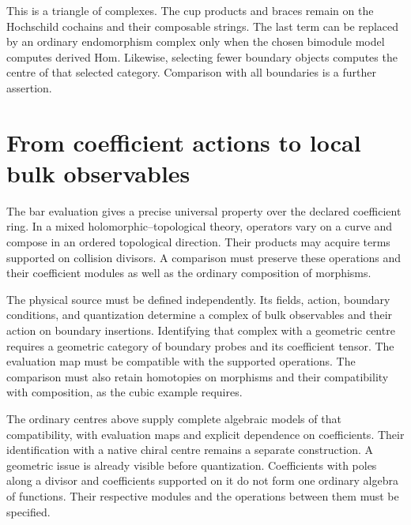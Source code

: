 This is a triangle of complexes. The cup products and braces
remain on the Hochschild cochains and their composable strings.
The last term can be replaced by an ordinary endomorphism
complex only when the chosen bimodule model computes derived Hom.
Likewise, selecting fewer boundary objects computes the centre
of that selected category. Comparison with all boundaries is
a further assertion.

\section{From coefficient actions to local bulk observables}
\label{sec:vol2-centre-geometric-comparison}

The bar evaluation gives a precise universal property over the
declared coefficient ring. In a mixed holomorphic--topological theory,
operators vary on a curve and compose in an ordered topological
direction. Their products may acquire terms supported on collision
divisors. A comparison must preserve these operations and their
coefficient modules as well as the ordinary composition of morphisms.

The physical source must be defined independently. Its fields,
action, boundary conditions, and quantization determine a complex
of bulk observables and their action on boundary insertions.
Identifying that complex with a geometric centre requires a geometric
category of boundary probes and its coefficient tensor.
The evaluation map must be compatible with the supported operations.
The comparison must also retain homotopies on morphisms and their
compatibility with composition, as the cubic example requires.

The ordinary centres above supply complete algebraic models of that
compatibility, with evaluation maps and explicit dependence on
coefficients. Their identification with a native chiral centre
remains a separate construction. A geometric issue is already visible
before quantization. Coefficients with poles along a divisor and
coefficients supported on it do not form one ordinary algebra of
functions. Their respective modules and the operations between them
must be specified.
